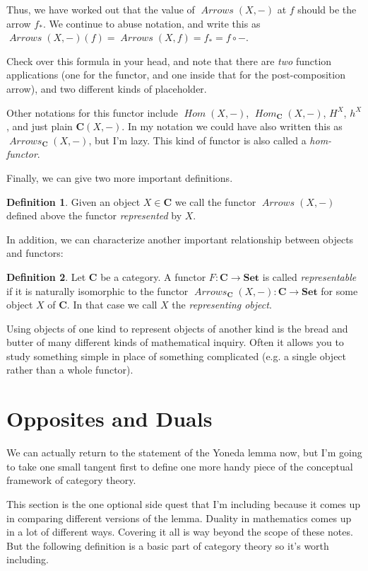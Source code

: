 \documentclass[12pt]{article}
\theoremstyle{definition}
\theoremstyle{definition}
\newtheorem{defn}{Definition}[]
\theoremstyle{definition}
\numberwithin{equation}{section}
\newcommand{\cat}[1]{\mathbf{#1}}      %
\newcommand{\fcat}[1]{{\mathbf {#1}}}    %
\newcommand{\CC}{\cat{C}}
\DeclareMathOperator{\Arrows}{\mathit{Arrows}}
\DeclareMathOperator{\Hom}{\mathit{Hom}}
\newcommand{\Set}{\fcat{Set}}           %
\def\ni{\goodbreak\noindent}
\begin{document}
Thus, we have worked out that the value of $\Arrows(X,-)$ at $f$ should be the arrow $f_*$.
We continue to abuse notation, and write this as
$\Arrows(X,-)(f) = \Arrows(X,f) = f_* = f \circ -$.

Check over this formula in your head, and note that 
there are {\it two} function applications (one for the functor, and one 
inside that for the post-composition arrow), 
and two different kinds of placeholder.

Other notations for this functor include $\Hom(X, -)$, $\Hom_\CC(X,
-)$, $H^X$, $h^X$, and just plain $\CC(X,-)$. 
In my notation we could have also written this as
$\Arrows_{\CC}(X, -)$, but I'm lazy. This kind of functor is also called a {\it hom-functor}.

Finally, we can give two more important definitions.
\begin{defn}
\label{represented}
Given an object $X \in \CC$ we call the functor $\Arrows(X,-)$ defined above the functor {\it represented} by $X$.
\end{defn}
\ni
In addition, we can characterize another important relationship between
objects and functors:

\begin{defn}
 Let $\cat{C}$ be a category. A functor $F:\cat{C}\to\Set$ is called \emph{representable}
 if it is naturally isomorphic to the functor $\Arrows_\cat{C}(X,-):\cat{C}\to\Set$ for some
 object $X$ of $\cat{C}$. In that case we call $X$ the \emph{representing object}. 
\end{defn}
\ni
Using objects of one kind to represent objects of another kind is the bread and butter of many
different kinds of mathematical inquiry. Often it allows  you to study something simple in place
of something complicated (e.g. a single object rather than a whole functor).

\section{Opposites and Duals}

We can actually return to the statement of the Yoneda lemma now, but 
I'm going to take one small tangent first to define one more handy piece of
the conceptual framework of category theory.

This section is the one optional side quest that I'm including because it comes up in
comparing different versions of the lemma. Duality in mathematics comes up in a lot of
different ways. Covering it all is way beyond the scope of these notes. But the following
definition is a basic part of category theory so it's worth including.
\end{document}
